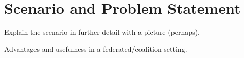\section{Scenario and Problem Statement}
\label{sec:scenario}
Explain the scenario in further detail with a picture (perhaps).

Advantages and usefulness in a federated/coalition setting.
